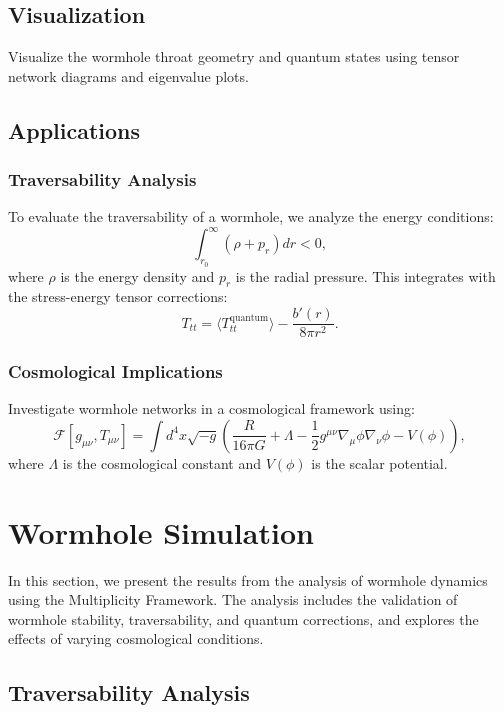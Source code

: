 \documentclass{article}
\theoremstyle{plain}
\begin{document}
\begin{itemize}
\begin{itemize}
\subsection{Visualization}
Visualize the wormhole throat geometry and quantum states using tensor network diagrams and eigenvalue plots.

\subsection{Applications}

\subsubsection{Traversability Analysis}
To evaluate the traversability of a wormhole, we analyze the energy conditions:
\begin{equation}
    \int_{r_0}^\infty \left(\rho + p_r\right) dr < 0,
\end{equation}
where $\rho$ is the energy density and $p_r$ is the radial pressure. This integrates with the stress-energy tensor corrections:
\begin{equation}
    T_{tt} = \langle T_{tt}^{\text{quantum}} \rangle - \frac{b'(r)}{8\pi r^2}.
\end{equation}

\subsubsection{Cosmological Implications}
Investigate wormhole networks in a cosmological framework using:
\begin{equation}
    \mathcal{F}[g_{\mu\nu}, T_{\mu\nu}] = \int d^4x \sqrt{-g} \left( \frac{R}{16\pi G} + \Lambda - \frac{1}{2}g^{\mu\nu}\nabla_\mu \phi \nabla_\nu \phi - V(\phi) \right),
\end{equation}
where $\Lambda$ is the cosmological constant and $V(\phi)$ is the scalar potential.

\section{Wormhole Simulation}

In this section, we present the results from the analysis of wormhole dynamics using the Multiplicity Framework. The analysis includes the validation of wormhole stability, traversability, and quantum corrections, and explores the effects of varying cosmological conditions.

\subsection{Traversability Analysis}


\end{itemize}
\end{itemize}
\end{document}
